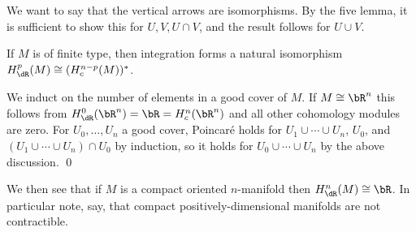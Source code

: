 We want to say that the vertical arrows are isomorphisms.
By the five lemma, it is sufficient to show this for $U,V,U\cap V$, and the result follows for $U\cup V$.

\bthrm[title={Poincar\'e Duality}, name={poincareduality}]

    If $M$ is of finite type, then integration forms a natural isomorphism $H^p_\dR(M)\cong(H^{n-p}_c(M))^*$.

\ethrm

\bproof

    We induct on the number of elements in a good cover of $M$.
    If $M\cong\bR^n$ this follows from $H^0_\dR(\bR^n)=\bR=H^n_c(\bR^n)$ and all other cohomology modules are zero.
    For $U_0,\dots,U_n$ a good cover, Poincar\'e holds for $U_1\cup\cdots\cup U_n$, $U_0$, and $(U_1\cup\cdots\cup U_n)\cap U_0$
    by induction, so it holds for $U_0\cup\cdots\cup U_n$ by the above discussion.
    \qed

\eproof

We then see that if $M$ is a compact oriented $n$-manifold then $H^n_\dR(M)\cong\bR$.
In particular note, say, that compact positively-dimensional manifolds are not contractible.

